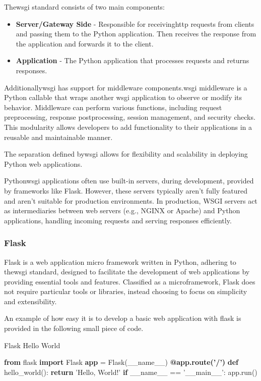     The\ac{wsgi} standard consists of two main components:
    \begin{itemize}
      \item \textbf{Server/Gateway Side} - Responsible for receiving\ac{http} requests from clients and passing them to the 
      Python application. Then receives the response from the application and forwards it to the client. 
      \item \textbf{Application} - The Python application that processes requests and returns responses.
    \end{itemize}

    Additionally\ac{wsgi} has support for middleware components.\ac{wsgi} middleware is a Python callable that wraps another
    \ac{wsgi} application to observe or modify its behavior. Middleware can perform various functions, including request 
    preprocessing, response postprocessing, session management, and security checks. This modularity allows developers to 
    add functionality to their applications in a reusable and maintainable manner.

    The separation defined by\ac{wsgi} allows for flexibility and scalability in deploying Python web applications.

    Python\ac{wsgi} applications often use built-in servers, during development, provided by frameworks like Flask. 
    However, these servers typically aren't fully featured and aren't suitable for production environments. In production, WSGI 
    servers act as intermediaries between web servers (e.g., NGINX or Apache) and Python applications, handling incoming requests 
    and serving responses efficiently.

    \subsubsection{Flask}
      Flask is a web application micro framework written in Python, adhering to the\ac{wsgi} standard, designed to 
      facilitate the development of web applications by providing essential tools and features. Classified as a microframework, 
      Flask does not require particular tools or libraries, instead choosing to focus on simplicity and extensibility\cite{flask2025}.

      An example of how easy it is to develop a basic web application with flask is provided in the following small 
      piece of code.

      \begin{algorithm}
        \caption{Flask Hello World}\label{flask-hello-world}
        \begin{algorithmic}[1]
          \State \textbf{from} flask \textbf{import} Flask
          \State \textbf{app} = Flask(\_\_name\_\_)
          \State
          \State \textbf{@app.route('/')}
          \State \textbf{def} hello\_world():
          \State \hspace{1em} \textbf{return} 'Hello, World!'
          \State
          \State \textbf{if} \_\_name\_\_ == '\_\_main\_\_':
          \State \hspace{1em} app.run()
        \end{algorithmic}
      \end{algorithm}

